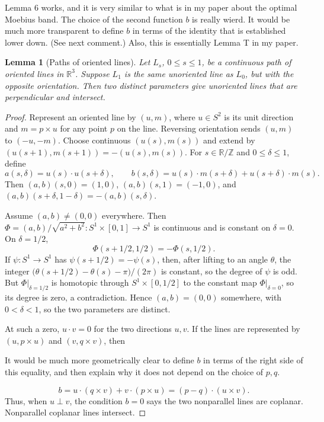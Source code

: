 \documentclass[12pt]{article}
\newcommand{\R}{\mathbb R}
\newcommand{\Z}{\mathbb Z}
\theoremstyle{plain}
\newtheorem{lemma}[theorem]{Lemma}
\newcommand{\review}[1]{\begin{reviewbox}#1\end{reviewbox}}
\begin{document}
\review{Lemma 6 works, and it is very similar to what is in my paper about the optimal Moebius band.  The choice of the second function $b$ is really wierd. It would be much more transparent to define $b$ in terms of the identity that is established lower down.  (See next comment.)  Also, this is essentially Lemma T in my paper.}

\begin{lemma}[Paths of oriented lines]\label{lem:lines}
Let \(L_s\), \(0\le s\le1\), be a continuous path of oriented lines in
\(\R^3\).  Suppose \(L_1\) is the same unoriented line as \(L_0\), but with the
opposite orientation.  Then two distinct parameters give unoriented lines that
are perpendicular and intersect.
\end{lemma}

\begin{proof}
Represent an oriented line by \((u,m)\), where \(u\in S^2\) is its unit
direction and \(m=p\times u\) for any point \(p\) on the line.  Reversing
orientation sends \((u,m)\) to \((-u,-m)\).  Choose continuous
\((u(s),m(s))\) and extend by \((u(s+1),m(s+1))=-(u(s),m(s))\).  For
\(s\in\R/\Z\) and \(0\le\delta\le1\), define
\[
a(s,\delta)=u(s)\cdot u(s+\delta),\qquad
b(s,\delta)=u(s)\cdot m(s+\delta)+u(s+\delta)\cdot m(s).
\]
Then \((a,b)(s,0)=(1,0)\), \((a,b)(s,1)=(-1,0)\), and
\((a,b)(s+\delta,1-\delta)=-(a,b)(s,\delta)\).

Assume \((a,b)\ne(0,0)\) everywhere.  Then
\(\Phi=(a,b)/\sqrt{a^2+b^2}:S^1\times[0,1]\to S^1\) is continuous and is
constant on \(\delta=0\).  On \(\delta=1/2\),
\[
\Phi(s+1/2,1/2)=-\Phi(s,1/2).
\]
If \(\psi:S^1\to S^1\) has \(\psi(s+1/2)=-\psi(s)\), then, after lifting to an
angle \(\theta\), the integer
\(\bigl(\theta(s+1/2)-\theta(s)-\pi\bigr)/(2\pi)\) is constant, so the degree
of \(\psi\) is odd.  But \(\Phi|_{\delta=1/2}\) is homotopic through
\(S^1\times[0,1/2]\) to the constant map \(\Phi|_{\delta=0}\), so its degree is
zero, a contradiction.  Hence \((a,b)=(0,0)\) somewhere, with
\(0<\delta<1\), so the two parameters are distinct.

At such a zero, \(u\cdot v=0\) for the two directions \(u,v\).  If the lines
are represented by \((u,p\times u)\) and \((v,q\times v)\), then



\review{It would be much more geometrically clear to define $b$ in terms of the right side of this equality, and then explain why it does not depend on the choice of $p,q$.}

\[
b=u\cdot(q\times v)+v\cdot(p\times u)=(p-q)\cdot(u\times v).
\]
Thus, when \(u\perp v\), the condition \(b=0\) says the two nonparallel lines
are coplanar.  Nonparallel coplanar lines intersect.
\end{proof}
\end{document}
